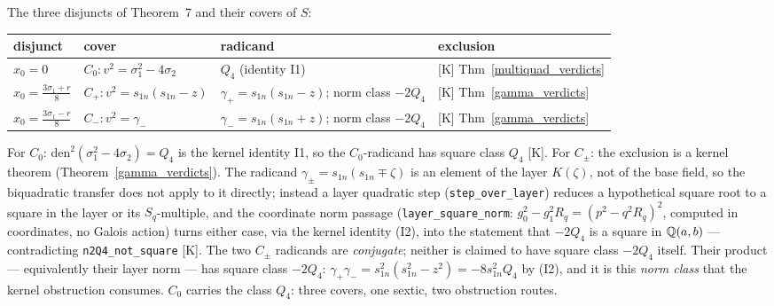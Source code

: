 The three disjuncts of Theorem~7 and their covers of $S$:

\begin{center}\begin{tabular}{llll}
disjunct & cover & radicand & exclusion \\ \hline
$x_{0}=0$ & $C_{0}\colon v^{2}=\sigma_{1}^{2}-4\sigma_{2}$ & $Q_{4}$ (identity I1) & [K] Thm~\ref{multiquad_verdicts} \\
$x_{0}=\tfrac{3\sigma_{1}+r}{8}$ & $C_{+}\colon v^{2}=s_{1n}(s_{1n}-z)$ & $\gamma_{+}=s_{1n}(s_{1n}-z)$; norm class $-2Q_{4}$ & [K] Thm~\ref{gamma_verdicts} \\
$x_{0}=\tfrac{3\sigma_{1}-r}{8}$ & $C_{-}\colon v^{2}=\gamma_{-}$ & $\gamma_{-}=s_{1n}(s_{1n}+z)$; norm class $-2Q_{4}$ & [K] Thm~\ref{gamma_verdicts} \\
\end{tabular}\end{center}

For $C_{0}$: $\mathrm{den}^{2}(\sigma_{1}^{2}-4\sigma_{2})=Q_{4}$ is the kernel
identity I1, so the $C_{0}$-radicand has square class $Q_{4}$ [K].  For
$C_{\pm}$: the exclusion is a kernel theorem (Theorem~\ref{gamma_verdicts}).
The radicand $\gamma_{\pm}=s_{1n}(s_{1n}\mp\zeta)$ is an element of the layer
$K(\zeta)$, not of the base field, so the biquadratic transfer does not apply to
it directly; instead a layer quadratic step (\texttt{step\_over\_layer}) reduces
a hypothetical square root to a square in the layer or its $S_{q}$-multiple, and
the coordinate norm passage (\texttt{layer\_square\_norm}:
$g_{0}^{2}-g_{1}^{2}R_{q}=(p^{2}-q^{2}R_{q})^{2}$, computed in coordinates, no
Galois action) turns either case, via the kernel identity (I2), into the
statement that $-2Q_{4}$ is a square in $\mathbb{Q}(a,b)$ --- contradicting
\texttt{n2Q4\_not\_square} [K].  The two $C_{\pm}$ radicands are \emph{conjugate}; neither is claimed to have
square class $-2Q_{4}$ itself.  Their product --- equivalently their layer norm ---
has square class $-2Q_{4}$:
$\gamma_{+}\gamma_{-}=s_{1n}^{2}(s_{1n}^{2}-z^{2})=-8s_{1n}^{2}Q_{4}$ by (I2), and
it is this \emph{norm class} that the kernel obstruction consumes.  $C_{0}$ carries
the class $Q_{4}$: three covers, one sextic, two obstruction routes.

